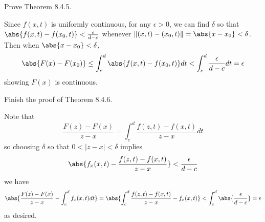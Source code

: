 \begin{exercise}
Prove Theorem 8.4.5.
\end{exercise}
\begin{solution}
Since \(f(x,t)\) is uniformly continuous, for any \(\epsilon > 0\), we can find \(\delta\) so that \(\abs{f(x,t) - f(x_0, t)} < \frac{\epsilon}{d-c}\) whenever \(\|(x,t) - (x_0, t) \| = \abs{x - x_0} < \delta\). Then when \(\abs{x - x_0} < \delta\),
\[\abs{F(x) - F(x_0)} \leq \int_c^d \abs{f(x, t) - f(x_0, t)} dt < \int_c^d \frac{\epsilon}{d-c} dt = \epsilon \]
showing \(F(x)\) is continuous.
\end{solution}

\begin{exercise}
Finish the proof of Theorem 8.4.6.
\end{exercise}
\begin{solution}
    Note that
    \[\frac{F(z) - F(x)}{z-x} = \int_c^d \frac{f(z,t) - f(x,t)}{z-x} dt\]
so choosing \(\delta\) so that \(0 < |z-x| < \delta\) implies
\[\abs{f_x(x,t) - \frac{f(z,t) - f(x,t)}{z-x}} < \frac{\epsilon}{d-c}\]
we have
\[\abs{\frac{F(z) - F(x)}{z-x} - \int_c^d f_x(x,t)dt} = \abs{\int_c^d \frac{f(z,t) - f(x,t)}{z-x} - f_x(x,t)} < \int_c^d \abs{\frac{\epsilon}{d-c}} = \epsilon\]
as desired.
\end{solution}
